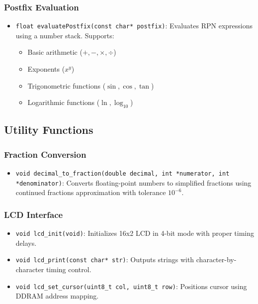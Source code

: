 \documentclass[journal]{IEEEtran}
\begin{document}
\subsubsection{Postfix Evaluation}
\begin{itemize}
\item \texttt{float evaluatePostfix(const char* postfix)}:
Evaluates RPN expressions using a number stack. Supports:
\begin{itemize}
\item Basic arithmetic ($+,-,\times,\div$)
\item Exponents ($x^y$)
\item Trigonometric functions ($\sin,\cos,\tan$)
\item Logarithmic functions ($\ln,\log_{10}$)
\end{itemize}
\end{itemize}

\subsection{Utility Functions}

\subsubsection{Fraction Conversion}
\begin{itemize}
\item \texttt{void decimal\_to\_fraction(double decimal, int *numerator, int *denominator)}:
Converts floating-point numbers to simplified fractions using continued fractions approximation with tolerance $10^{-6}$.
\end{itemize}

\subsubsection{LCD Interface}
\begin{itemize}
\item \texttt{void lcd\_init(void)}:
Initializes 16x2 LCD in 4-bit mode with proper timing delays.

\item \texttt{void lcd\_print(const char* str)}:
Outputs strings with character-by-character timing control.

\item \texttt{void lcd\_set\_cursor(uint8\_t col, uint8\_t row)}:
Positions cursor using DDRAM address mapping.
\end{itemize}
\end{document}
